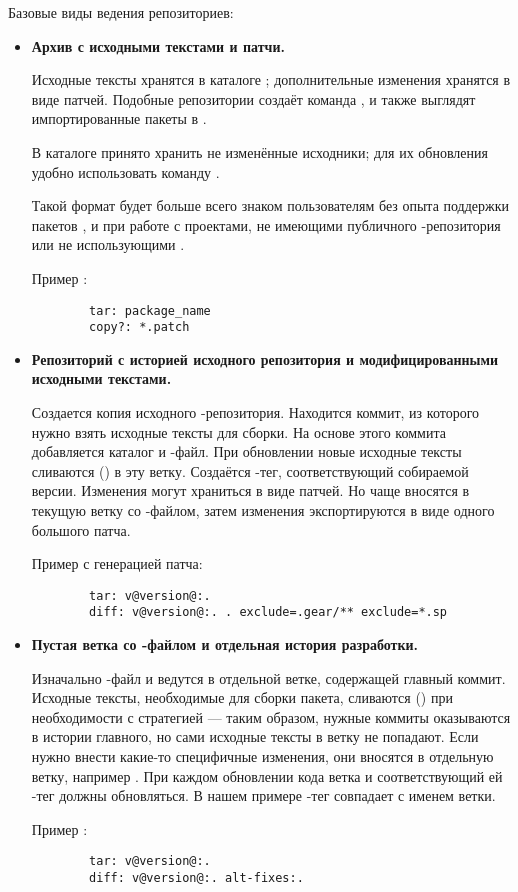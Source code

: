 Базовые виды ведения  репозиториев:
\begin{itemize}
	\item \textbf{Архив с исходными текстами и патчи.}
	
	Исходные тексты хранятся в каталоге ; дополнительные изменения хранятся в виде патчей. Подобные репозитории создаёт команда , и также выглядят импортированные пакеты в .
	
	В каталоге  принято хранить не изменённые исходники; для их обновления удобно использовать команду .
	
	Такой формат будет больше всего знаком пользователям без опыта поддержки пакетов , и при работе с проектами, не имеющими публичного -репозитория или не использующими .
	
	Пример :
	\begin{verbatim}
		tar: package_name
		copy?: *.patch
	\end{verbatim} 
	
	\item \textbf{Репозиторий с историей исходного репозитория и модифицированными исходными текстами.}
	
	Создается копия исходного -репозитория. Находится коммит, из которого нужно взять исходные тексты для сборки. На основе этого коммита добавляется каталог  и -файл. При обновлении новые исходные тексты сливаются () в эту ветку. Создаётся -тег, соответствующий собираемой версии. Изменения могут храниться в виде патчей. Но чаще вносятся в текущую ветку со -файлом, затем изменения экспортируются в виде одного большого патча. 
	
	Пример  с генерацией патча:
	\begin{verbatim}
		tar: v@version@:.
		diff: v@version@:. . exclude=.gear/** exclude=*.sp
	\end{verbatim}
	
	\item \textbf{Пустая ветка со -файлом и отдельная история разработки.}
	
	Изначально -файл и  ведутся в отдельной ветке, содержащей главный коммит. Исходные тексты, необходимые для сборки пакета, сливаются () при необходимости с  стратегией  --- таким образом, нужные коммиты оказываются в истории главного, но сами исходные тексты в ветку не попадают. Если нужно внести какие-то специфичные изменения, они вносятся в отдельную ветку, например . При каждом обновлении кода ветка  и соответствующий ей -тег должны обновляться. В нашем примере -тег совпадает с именем ветки. 
	
	Пример :
	\begin{verbatim}
		tar: v@version@:.
		diff: v@version@:. alt-fixes:.
	\end{verbatim} 
\end{itemize}


